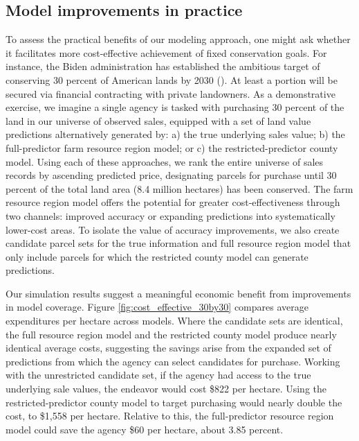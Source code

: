 \documentclass[12pt]{article}
\begin{document}
\subsection{Model improvements in practice} 

To assess the practical benefits of our modeling approach, one might ask whether it facilitates more cost-effective achievement of fixed conservation goals. For instance, the Biden administration has established the ambitious target of conserving 30 percent of American lands by 2030 (\cite{ceq2021}). At least a portion will be secured via financial contracting with private landowners. As a demonstrative exercise, we imagine a single agency is tasked with purchasing 30 percent of the land in our universe of observed sales, equipped with a set of land value predictions alternatively generated by: a) the true underlying sales value; b) the full-predictor farm resource region model; or c) the restricted-predictor county model. Using each of these approaches, we rank the entire universe of sales records by ascending predicted price, designating parcels for purchase until 30 percent of the total land area (8.4 million hectares) has been conserved. The farm resource region model offers the potential for greater cost-effectiveness through two channels: improved accuracy or expanding predictions into systematically lower-cost areas. To isolate the value of accuracy improvements, we also create candidate parcel sets for the true information and full resource region model that only include parcels for which the restricted county model can generate predictions.

Our simulation results suggest a meaningful economic benefit from improvements in model coverage. Figure \ref{fig:cost_effective_30by30} compares average expenditures per hectare across models. Where the candidate sets are identical, the full resource region model and the restricted county model produce nearly identical average costs, suggesting the savings arise from the expanded set of predictions from which the agency can select candidates for purchase. Working with the unrestricted candidate set, if the agency had access to the true underlying sale values, the endeavor would cost \$822 per hectare. Using the restricted-predictor county model to target purchasing would nearly double the cost, to \$1,558 per hectare. Relative to this, the full-predictor resource region model could save the agency \$60 per hectare, about 3.85 percent. 
\end{document}
